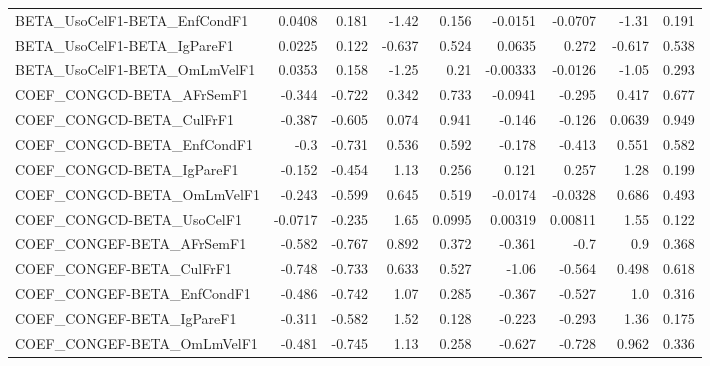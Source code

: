 \begin{tabular}{lrrrrrrrr}
BETA\_UsoCelF1-BETA\_EnfCondF1          &      0.0408 &        0.181 &   -1.42 &    0.156 &    -0.0151 &     -0.0707 &        -1.31 &         0.191 \\
BETA\_UsoCelF1-BETA\_IgPareF1           &      0.0225 &        0.122 &  -0.637 &    0.524 &     0.0635 &       0.272 &       -0.617 &         0.538 \\
BETA\_UsoCelF1-BETA\_OmLmVelF1          &      0.0353 &        0.158 &   -1.25 &     0.21 &   -0.00333 &     -0.0126 &        -1.05 &         0.293 \\
COEF\_CONGCD-BETA\_AFrSemF1             &      -0.344 &       -0.722 &   0.342 &    0.733 &    -0.0941 &      -0.295 &        0.417 &         0.677 \\
COEF\_CONGCD-BETA\_CulFrF1              &      -0.387 &       -0.605 &   0.074 &    0.941 &     -0.146 &      -0.126 &       0.0639 &         0.949 \\
COEF\_CONGCD-BETA\_EnfCondF1            &        -0.3 &       -0.731 &   0.536 &    0.592 &     -0.178 &      -0.413 &        0.551 &         0.582 \\
COEF\_CONGCD-BETA\_IgPareF1             &      -0.152 &       -0.454 &    1.13 &    0.256 &      0.121 &       0.257 &         1.28 &         0.199 \\
COEF\_CONGCD-BETA\_OmLmVelF1            &      -0.243 &       -0.599 &   0.645 &    0.519 &    -0.0174 &     -0.0328 &        0.686 &         0.493 \\
COEF\_CONGCD-BETA\_UsoCelF1             &     -0.0717 &       -0.235 &    1.65 &   0.0995 &    0.00319 &     0.00811 &         1.55 &         0.122 \\
COEF\_CONGEF-BETA\_AFrSemF1             &      -0.582 &       -0.767 &   0.892 &    0.372 &     -0.361 &        -0.7 &          0.9 &         0.368 \\
COEF\_CONGEF-BETA\_CulFrF1              &      -0.748 &       -0.733 &   0.633 &    0.527 &      -1.06 &      -0.564 &        0.498 &         0.618 \\
COEF\_CONGEF-BETA\_EnfCondF1            &      -0.486 &       -0.742 &    1.07 &    0.285 &     -0.367 &      -0.527 &          1.0 &         0.316 \\
COEF\_CONGEF-BETA\_IgPareF1             &      -0.311 &       -0.582 &    1.52 &    0.128 &     -0.223 &      -0.293 &         1.36 &         0.175 \\
COEF\_CONGEF-BETA\_OmLmVelF1            &      -0.481 &       -0.745 &    1.13 &    0.258 &     -0.627 &      -0.728 &        0.962 &         0.336 \\

\end{tabular}

